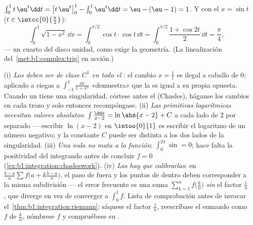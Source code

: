 \begin{example}\label{ex:b1:integration:parts}
$\int_0^1 t\,\eu^t \dd t = \bigl[t\,\eu^t\bigr]_0^1 - \int_0^1
\eu^t\dd t = \eu - (\eu - 1) = 1$. Y con el 
$x = \sin t$ ($t \in \intcc{0}{\frac\pi2}$):
\[
\int_0^1 \sqrt{1 - x^2}\, \dd x
= \int_0^{\pi/2} \cos t \cdot \cos t \, \dd t
= \int_0^{\pi/2} \frac{1 + \cos 2t}{2}\, \dd t = \frac\pi4 ,
\]
--- un cuarto del disco unidad, como exige la geometría.
(La linealización del~\cref{met:b1:complex:trig} en acción.)
\end{example}

\begin{remark}
(i) \emph{Los  deben ser de clase $C^1$ en todo el
}: el cambio $x = \frac1t$ es ilegal a caballo de $0$;
aplicado a ciegas a $\int_{-1}^{1}\frac{\dd x}{1 + x^2}$
«demuestra» que la  es igual a su propia opuesta. Cuando un
 tiene una singularidad, córtese antes el 
(Chasles), háganse los cambios en cada trozo y solo entonces
recompóngase. (ii) \emph{Las primitivas logarítmicas necesitan valores
absolutos}: $\int \frac{\dd x}{x - 2} = \ln\abs{x - 2} + C$ a cada
lado de $2$ por separado --- escribir $\ln(x - 2)$ en $\intoo{0}{1}$
es escribir el logaritmo de un número negativo; y la constante $C$
puede ser distinta a los dos lados de la singularidad. (iii) \emph{Una
 nula no mata a la función}: $\int_0^{2\pi}\sin = 0$; hace
falta la positividad del integrando antes de concluir $f = 0$
(\cref{ex:b1:integration:chasleswork}). (iv) \emph{Las  hay que calibrarlas}: en
$\frac{b-a}{n}\sum f\bigl(a + k\frac{b-a}{n}\bigr)$, el paso de fuera
y los puntos de dentro deben corresponder a la misma subdivisión ---
el error frecuente es una suma $\sum_{k=1}^{n} f\bigl(\frac kn\bigr)$
\emph{sin} el factor $\frac1n$, que diverge en vez de converger a
$\int_0^1 f$. Lista de comprobación antes de invocar
el~\cref{thm:b1:integration:riemann}: sáquese el factor $\frac1n$,
reescríbase el sumando como $f$ de $\frac kn$, nómbrese $f$ y
compruébese su .
\end{remark}


